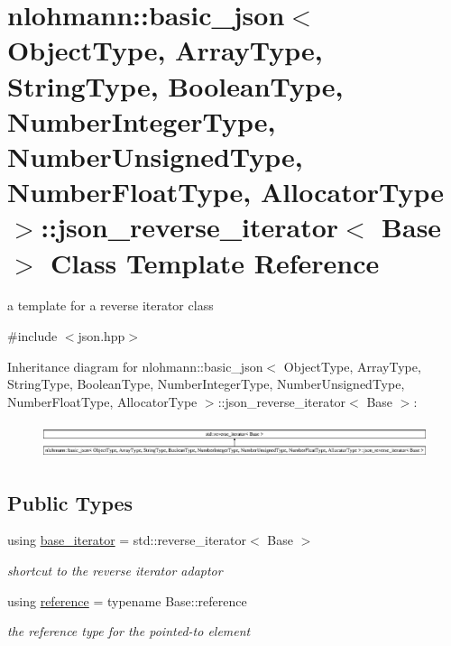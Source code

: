 \hypertarget{a00080}{}\section{nlohmann\+:\+:basic\+\_\+json$<$ Object\+Type, Array\+Type, String\+Type, Boolean\+Type, Number\+Integer\+Type, Number\+Unsigned\+Type, Number\+Float\+Type, Allocator\+Type $>$\+:\+:json\+\_\+reverse\+\_\+iterator$<$ Base $>$ Class Template Reference}
\label{a00080}


a template for a reverse iterator class  




{\ttfamily \#include $<$json.\+hpp$>$}

Inheritance diagram for nlohmann\+:\+:basic\+\_\+json$<$ Object\+Type, Array\+Type, String\+Type, Boolean\+Type, Number\+Integer\+Type, Number\+Unsigned\+Type, Number\+Float\+Type, Allocator\+Type $>$\+:\+:json\+\_\+reverse\+\_\+iterator$<$ Base $>$\+:\begin{figure}[H]
\begin{center}
\leavevmode
\includegraphics[height=1.036078cm]{a00080}
\end{center}
\end{figure}
\subsection*{Public Types}
\begin{DoxyCompactItemize}
\item 
using \hyperlink{a00080_a9ebc4c99e6fc90c965af0f39ad2ca70e}{base\+\_\+iterator} = std\+::reverse\+\_\+iterator$<$ Base $>$\hypertarget{a00080_a9ebc4c99e6fc90c965af0f39ad2ca70e}{}\label{a00080_a9ebc4c99e6fc90c965af0f39ad2ca70e}

\begin{DoxyCompactList}\small\item\em shortcut to the reverse iterator adaptor \end{DoxyCompactList}\item 
using \hyperlink{a00080_a7265535f39299824f9712a2ca15013c3}{reference} = typename Base\+::reference\hypertarget{a00080_a7265535f39299824f9712a2ca15013c3}{}\label{a00080_a7265535f39299824f9712a2ca15013c3}

\begin{DoxyCompactList}\small\item\em the reference type for the pointed-\/to element \end{DoxyCompactList}\end{DoxyCompactItemize}
